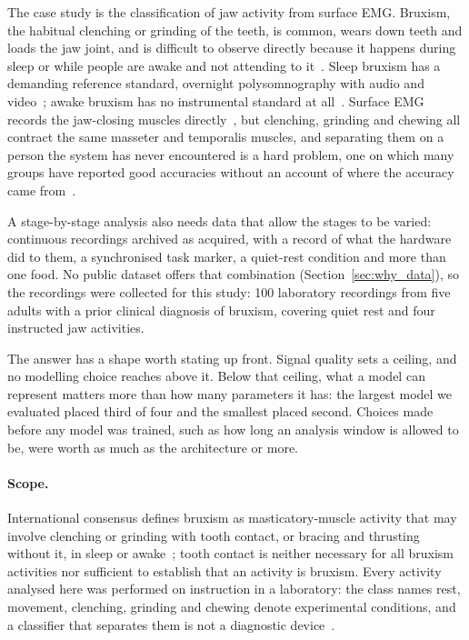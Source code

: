 \documentclass[pdflatex,sn-nature,iicol]{sn-jnl}
\begin{document}
The case study is the classification of jaw activity from surface EMG. Bruxism, the habitual clenching or grinding of the teeth, is common, wears down teeth and loads the jaw joint, and is difficult to observe directly because it happens during sleep or while people are awake and not attending to it~\cite{lavigne2008bruxism,manfredini2013epidemiology,melo2019bruxism,wetselaar2019prevalence}. Sleep bruxism has a demanding reference standard, overnight polysomnography with audio and video~\cite{lavigne1996sleep}; awake bruxism has no instrumental standard at all~\cite{bracci2018frequency,zani2019ecological}. Surface EMG records the jaw-closing muscles directly~\cite{raez2006techniques,colonna2023electromyographic,thymi2021signal}, but clenching, grinding and chewing all contract the same masseter and temporalis muscles, and separating them on a person the system has never encountered is a hard problem, one on which many groups have reported good accuracies without an account of where the accuracy came from~\cite{sonmezocak2021detection,gul2024advanced,ishtiaq2025wearable,heyat2020computational}.

A stage-by-stage analysis also needs data that allow the stages to be varied: continuous recordings archived as acquired, with a record of what the hardware did to them, a synchronised task marker, a quiet-rest condition and more than one food. No public dataset offers that combination (Section~\ref{sec:why_data}), so the recordings were collected for this study: 100 laboratory recordings from five adults with a prior clinical diagnosis of bruxism, covering quiet rest and four instructed jaw activities.

The answer has a shape worth stating up front. Signal quality sets a ceiling, and no modelling choice reaches above it. Below that ceiling, what a model can represent matters more than how many parameters it has: the largest model we evaluated placed third of four and the smallest placed second. Choices made before any model was trained, such as how long an analysis window is allowed to be, were worth as much as the architecture or more.

\paragraph{Scope.} International consensus defines bruxism as masticatory-muscle activity that may involve clenching or grinding with tooth contact, or bracing and thrusting without it, in sleep or awake~\cite{lobbezoo2013bruxism,lobbezoo2018international,verhoeff2025definitions,manfredini2022bruxism}; tooth contact is neither necessary for all bruxism activities nor sufficient to establish that an activity is bruxism. Every activity analysed here was performed on instruction in a laboratory: the class names rest, movement, clenching, grinding and chewing denote experimental conditions, and a classifier that separates them is not a diagnostic device~\cite{manfredini2024standardised}.
\end{document}
